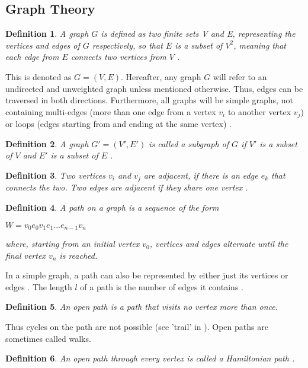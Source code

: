 \documentclass[12pt,a4paper]{article}
\newtheorem{definition}{Definition}
\begin{document}
\subsection{Graph Theory}

\begin{definition}
A graph $G$ is defined as two finite sets V and E, representing the vertices and edges of $G$ respectively, so that $E$ is a subset of $ V ^ 2$, meaning that each edge from $E$ connects two vertices from $V$ \citep[p. 1]{Bollobas1998}.
\end{definition} 
This is denoted as $G = (V, E)$. Hereafter, any graph $G$ will refer to an undirected and unweighted graph unless mentioned otherwise. Thus, edges can be traversed in both directions. Furthermore, all graphs will be simple graphs, not containing multi-edges (more than one edge from a vertex $v_i$ to another vertex $v_j$) or loops (edges starting from and ending at the same vertex) \citep[pp. 3-4]{Gross2013}. 
\begin{definition}
A graph $G' = (V', E')$ is called a subgraph of $G$ if $V'$ is a subset of $V$ and $E'$ is a subset of $E$ \citep[p. 2]{Bollobas1998}.
\end{definition}
\begin{definition}
Two vertices $v_i$ and $v_j$ are \textit{adjacent}, if there is an edge $e_k$ that connects the two. Two edges are adjacent if they share one vertex \citep[p. 1-2]{Bollobas1998}. 
\end{definition}
\begin{definition}
A path on a graph is a sequence of the form 
\begin{center}
	$ W = v_0 e_0 v_1 e_1...e_{n-1} v_n $
\end{center}
where, starting from an initial vertex $v_0$, vertices and edges alternate until the final vertex $v_n$ is reached.
\end{definition}
In a simple graph, a path can also be represented by either just its vertices \citep[p. 10]{Gross2013} or edges \citep[p. 4]{Bollobas1998}. The length $l$ of a path is the number of edges it contains \citep[p. 5]{Bollobas1998}.
\begin{definition}
An open path is a path that visits no vertex more than once.
\end{definition} Thus cycles on the path are not possible (see 'trail' in \citep[p. 10]{Gross2013}). Open paths are sometimes called walks. 
\begin{definition}An open path through every vertex is called a Hamiltonian path \citep[p. 14]{Bollobas1998}.
\end{definition}
\end{document}
